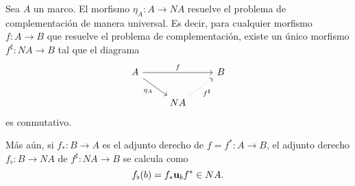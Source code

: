 \begin{thm}
  Sea $A$ un marco.
  El morfismo $\eta_A:A\to NA$ resuelve el problema de
  complementación de manera universal.
  Es decir, para cualquier morfismo $f:A\to B$ que resuelve el
  problema de complementación, existe un único morfismo
  $f^\sharp:NA\to B$ tal que el diagrama
  \[
    \begin{tikzcd}
      A \ar[dr,"\eta_A"'] \ar[rr,"f"] && B \\
      & NA \ar[ur,"f^\sharp"',dotted]
    \end{tikzcd}
  \]
  es conmutativo.

  Más aún, si $f_*:B\to A$ es el adjunto derecho de $f=f^*:A\to
  B$, el adjunto derecho $f_\flat:B\to NA$ de $f^\sharp:NA\to B$
  se calcula como
  \[
    f_\flat(b) = f_*\mathbf u_{b} f^* \in NA
  .\]
\end{thm}
